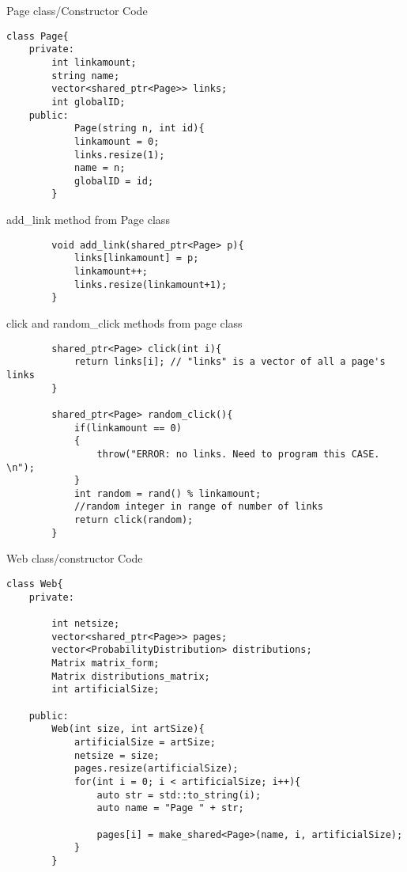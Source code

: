 \documentclass{article}
\begin{document}
\begin{enumerate}[label={[\arabic*]}]

\item Page class/Constructor Code
\begin{lstlisting}
class Page{
    private:
        int linkamount;
        string name;
        vector<shared_ptr<Page>> links;
        int globalID;
    public:
            Page(string n, int id){
            linkamount = 0;
            links.resize(1);
            name = n;
            globalID = id;
        }
 \end{lstlisting}

\item add\_link method from Page class
 \begin{lstlisting}
        void add_link(shared_ptr<Page> p){
            links[linkamount] = p;
            linkamount++;
            links.resize(linkamount+1);
        }
 \end{lstlisting}

\item click and random\_click methods from page class
   \begin{lstlisting}
        shared_ptr<Page> click(int i){
            return links[i]; // "links" is a vector of all a page's links
        }

        shared_ptr<Page> random_click(){
            if(linkamount == 0)
            {
                throw("ERROR: no links. Need to program this CASE. \n");
            }
            int random = rand() % linkamount; 
            //random integer in range of number of links
            return click(random);
        }
 \end{lstlisting}
 
\item Web class/constructor Code
\begin{lstlisting}
class Web{
    private:

        int netsize;
        vector<shared_ptr<Page>> pages;
        vector<ProbabilityDistribution> distributions;
        Matrix matrix_form;
        Matrix distributions_matrix;
        int artificialSize;

    public:
        Web(int size, int artSize){
            artificialSize = artSize;
            netsize = size;
            pages.resize(artificialSize);
            for(int i = 0; i < artificialSize; i++){
                auto str = std::to_string(i);
                auto name = "Page " + str;
                
                pages[i] = make_shared<Page>(name, i, artificialSize);
            }
        }
\end{lstlisting}


\end{enumerate}
\end{document}

